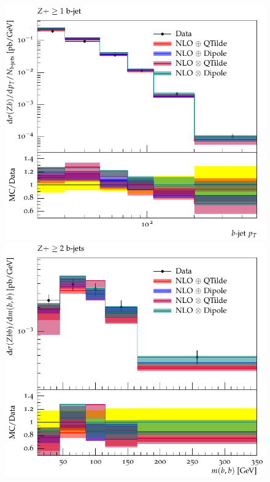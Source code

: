 \documentclass[11pt]{cernrep} \usepackage{graphicx,epsfig} 
\begin{document}
\begin{figure}[htbp]
\begin{center}
   \includegraphics[scale=0.65]{figs/zbb/herwigzb/d03-x01-y01.pdf} 
   \includegraphics[scale=0.65]{figs/zbb/herwigzb/d23-x01-y01.pdf} \\

\end{center}
\end{figure}
\end{document}
